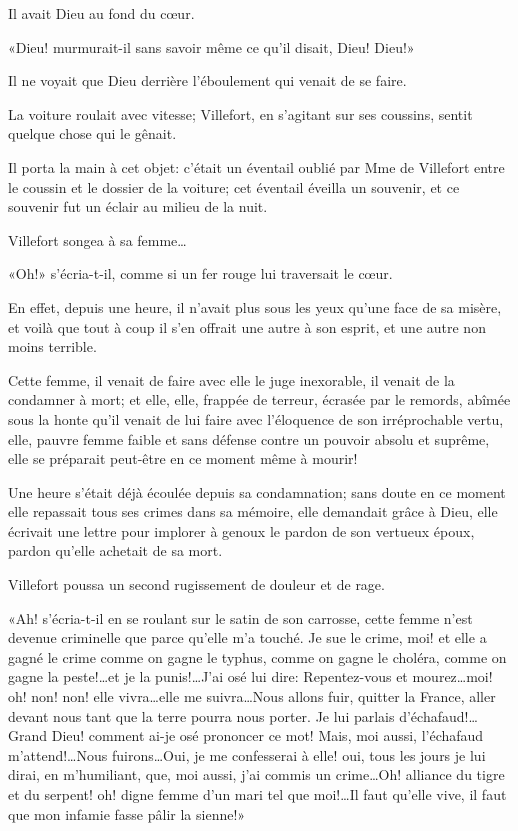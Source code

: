 Il avait Dieu au fond du cœur. 

«Dieu! murmurait-il sans savoir même ce qu'il disait, Dieu! Dieu!» 

Il ne voyait que Dieu derrière l'éboulement qui venait de se faire. 

La voiture roulait avec vitesse; Villefort, en s'agitant sur ses coussins, sentit quelque chose qui le gênait. 

Il porta la main à cet objet: c'était un éventail oublié par Mme de Villefort entre le coussin et le dossier de la voiture; cet éventail éveilla un souvenir, et ce souvenir fut un éclair au milieu de la nuit. 

Villefort songea à sa femme\dots 

«Oh!» s'écria-t-il, comme si un fer rouge lui traversait le cœur. 

En effet, depuis une heure, il n'avait plus sous les yeux qu'une face de sa misère, et voilà que tout à coup il s'en offrait une autre à son esprit, et une autre non moins terrible. 

Cette femme, il venait de faire avec elle le juge inexorable, il venait de la condamner à mort; et elle, elle, frappée de terreur, écrasée par le remords, abîmée sous la honte qu'il venait de lui faire avec l'éloquence de son irréprochable vertu, elle, pauvre femme faible et sans défense contre un pouvoir absolu et suprême, elle se préparait peut-être en ce moment même à mourir! 

Une heure s'était déjà écoulée depuis sa condamnation; sans doute en ce moment elle repassait tous ses crimes dans sa mémoire, elle demandait grâce à Dieu, elle écrivait une lettre pour implorer à genoux le pardon de son vertueux époux, pardon qu'elle achetait de sa mort. 

Villefort poussa un second rugissement de douleur et de rage. 

«Ah! s'écria-t-il en se roulant sur le satin de son carrosse, cette femme n'est devenue criminelle que parce qu'elle m'a touché. Je sue le crime, moi! et elle a gagné le crime comme on gagne le typhus, comme on gagne le choléra, comme on gagne la peste!\dots et je la punis!\dots J'ai osé lui dire: Repentez-vous et mourez\dots moi! oh! non! non! elle vivra\dots elle me suivra\dots Nous allons fuir, quitter la France, aller devant nous tant que la terre pourra nous porter. Je lui parlais d'échafaud!\dots Grand Dieu! comment ai-je osé prononcer ce mot! Mais, moi aussi, l'échafaud m'attend!\dots Nous fuirons\dots Oui, je me confesserai à elle! oui, tous les jours je lui dirai, en m'humiliant, que, moi aussi, j'ai commis un crime\dots Oh! alliance du tigre et du serpent! oh! digne femme d'un mari tel que moi!\dots Il faut qu'elle vive, il faut que mon infamie fasse pâlir la sienne!» 

